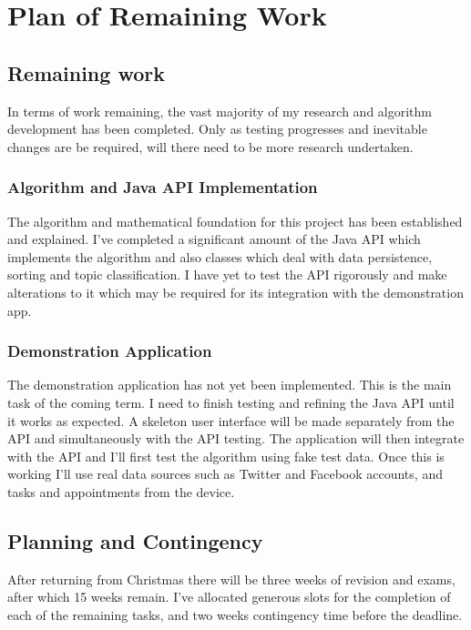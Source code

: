 \chapter{Plan of Remaining Work}

\section{Remaining work}

In terms of work remaining, the vast majority of my research and algorithm development has been completed. Only as testing progresses and inevitable changes are be required, will there need to be more research undertaken. 

\subsection{Algorithm and Java API Implementation}

The algorithm and mathematical foundation for this project has been established and explained. I've completed a significant amount of the Java API which implements the algorithm and also classes which deal with data persistence, sorting and topic classification. I have yet to test the API rigorously and make alterations to it which may be required for its integration with the demonstration app. 

\subsection{Demonstration Application}

The demonstration application has not yet been implemented. This is the main task of the coming term. I need to finish testing and refining the Java API until it works as expected. A skeleton user interface will be made separately from the API and simultaneously with the API testing. The application will then integrate with the API and I'll first test the algorithm using fake test data. Once this is working I'll use real data sources such as Twitter and Facebook accounts, and  tasks and appointments from the device. 

\section{Planning and Contingency}

After returning from Christmas there will be three weeks of revision and exams, after which 15 weeks remain. I've allocated generous slots for the completion of each of the remaining tasks, and two weeks contingency time before the deadline. 

